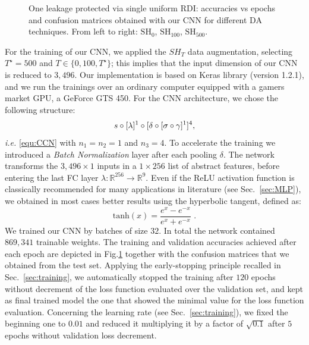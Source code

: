 \begin{figure}[t]
\caption{One leakage protected via single uniform RDI: accuracies vs epochs and confusion matrices obtained with our CNN for different DA techniques. From left to right: $\mathrm{SH}_0$, $\mathrm{SH}_{100}$, $\mathrm{SH}_{500}$. }\label{fig:CW_shift_history}
\end{figure}

For the training of our CNN, we applied the $SH_T$ data augmentation, selecting $T^\star = 500$ and $T \in \{ 0,100, T^\star\}$; this implies that the input dimension of our CNN is reduced to $3,496$. Our implementation is based on Keras library \cite{keras} (version 1.2.1), and we run the trainings over an ordinary computer equipped with a gamers market GPU, a GeForce GTS 450. For the CNN architecture, we chose the following structure: 
\begin{equation}\label{eq:archi}
  s \circ [\lambda]^1 \circ[\delta \circ [\sigma \circ \gamma  ]^1 ]^4,   
\end{equation}
\emph{i.e.} \eqref{equ:CCN} with $n_1 = n_2 = 1$ and $n_3 = 4$.
To accelerate the training we introduced a \emph{Batch Normalization} layer \cite{batch_norm} after each pooling $\delta$. The network transforms the $3,496 \times 1$ inputs in a $1 \times 256$ list of abstract features, before entering the last FC layer $\lambda:\mathbb{R}^{256}\rightarrow \mathbb{R}^9$. Even if the ReLU activation function \cite{nair2010rectified} is classically recommended for many applications in literature (see Sec.~\ref{sec:MLP}), we obtained in most cases better results using the hyperbolic tangent, defined as:
\begin{equation}
\mathrm{tanh}(x) = \frac{e^x-e^{-x}}{e^x+e^{-x}} \mbox{ .}
\end{equation}
We trained our CNN by batches of size $32$.  In total the network contained $869,341$ trainable weights. The training and validation accuracies achieved after each epoch are depicted in Fig.\ref{fig:CW_shift_history} together with the confusion matrices that we obtained from the test set. Applying the early-stopping principle recalled in Sec.~\ref{sec:training},  we automatically stopped the training after $120$ epochs without decrement of the loss function evaluated over the validation set, and kept as final trained model the one that showed the minimal value for the loss function evaluation. Concerning the learning rate (see Sec.~\ref{sec:training}), we fixed the beginning one to $0.01$ and reduced it multiplying it by a factor of $\sqrt{0.1}$ after $5$ epochs without validation loss decrement.


